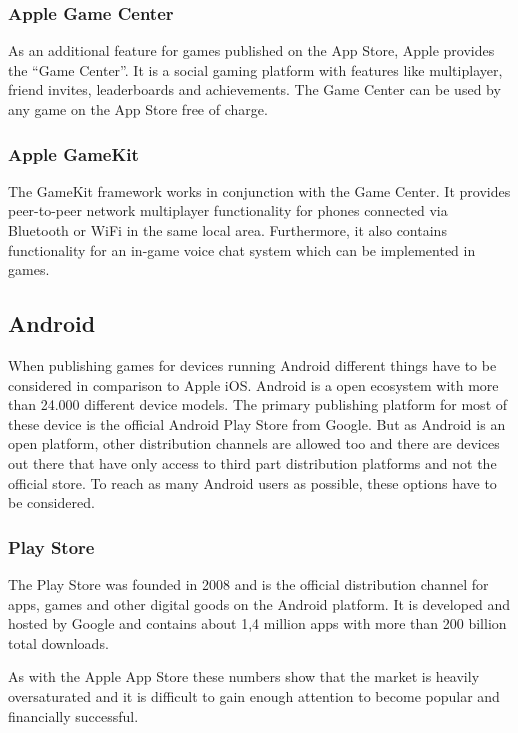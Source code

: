 \subsubsection{Apple Game Center}
\label{subsec:ios_game_center}
As an additional feature for games published on the App Store, Apple provides the “Game Center”. It is a social gaming platform with features like multiplayer, friend invites, leaderboards and achievements. The Game Center can be used by any game on the App Store free of charge. \citep{apple_game_2016}

\subsubsection{Apple GameKit}
\label{subsec:ios_game_kit}
The GameKit framework works in conjunction with the Game Center. It provides peer-to-peer network multiplayer functionality for phones connected via Bluetooth or WiFi in the same local area. Furthermore, it also contains functionality for an in-game voice chat system which can be implemented in games. \citep{apple_gamekit_2016}

\subsection{Android}
\label{subsec:android}
When publishing games for devices running Android different things have to be considered in comparison to Apple iOS. Android is a open ecosystem with more than 24.000 \citep{opensignal_android_2015} different device models. The primary publishing platform for most of these device is the official Android Play Store from Google. But as Android is an open platform, other distribution channels are allowed too and there are devices out there that have only access to third part distribution platforms and not the official store. To reach as many Android users as possible, these options have to be considered.

\subsubsection{Play Store}
\label{subsec:android_play_store}
The Play Store was founded in 2008 and is the official distribution channel for apps, games and other digital goods on the Android platform. It is developed and hosted by Google and contains about 1,4 million apps \citep{ranger_ios_2015} with more than 200 billion total downloads. \citep{protalinski_app_2016}

As with the Apple App Store these numbers show that the market is heavily oversaturated and it is difficult to gain enough attention to become popular and financially successful. 


